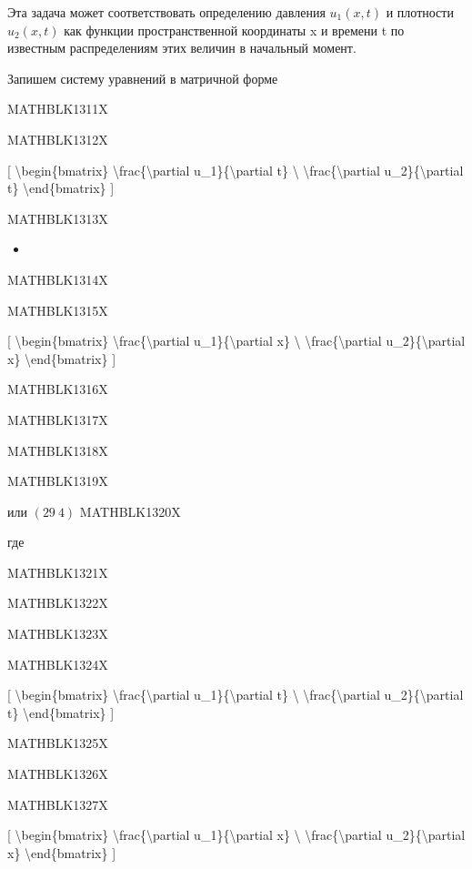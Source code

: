 \documentclass[
]{article}
\providecommand{\tightlist}{%
  \setlength{\itemsep}{0pt}\setlength{\parskip}{0pt}}
\begin{document}
Эта задача может соответствовать определению давления \(u_1(x, t)\) и
плотности \(u_2(x, t)\) как функции пространственной координаты x и
времени t по известным распределениям этих величин в начальный момент.

Запишем систему уравнений в матричной форме

MATHBLK1311X

MATHBLK1312X

{[} \textbackslash begin\{bmatrix\}
\textbackslash frac\{\textbackslash partial
u\_1\}\{\textbackslash partial t\} \textbackslash{}
\textbackslash frac\{\textbackslash partial
u\_2\}\{\textbackslash partial t\} \textbackslash end\{bmatrix\} {]}

MATHBLK1313X

\begin{itemize}
\tightlist
\item
\end{itemize}

MATHBLK1314X

MATHBLK1315X

{[} \textbackslash begin\{bmatrix\}
\textbackslash frac\{\textbackslash partial
u\_1\}\{\textbackslash partial x\} \textbackslash{}
\textbackslash frac\{\textbackslash partial
u\_2\}\{\textbackslash partial x\} \textbackslash end\{bmatrix\} {]}

MATHBLK1316X

MATHBLK1317X

MATHBLK1318X

MATHBLK1319X

или \((29 \ 4)\) MATHBLK1320X

где

MATHBLK1321X

MATHBLK1322X

MATHBLK1323X

MATHBLK1324X

{[} \textbackslash begin\{bmatrix\}
\textbackslash frac\{\textbackslash partial
u\_1\}\{\textbackslash partial t\} \textbackslash{}
\textbackslash frac\{\textbackslash partial
u\_2\}\{\textbackslash partial t\} \textbackslash end\{bmatrix\} {]}

MATHBLK1325X

MATHBLK1326X

MATHBLK1327X

{[} \textbackslash begin\{bmatrix\}
\textbackslash frac\{\textbackslash partial
u\_1\}\{\textbackslash partial x\} \textbackslash{}
\textbackslash frac\{\textbackslash partial
u\_2\}\{\textbackslash partial x\} \textbackslash end\{bmatrix\} {]}
\end{document}
